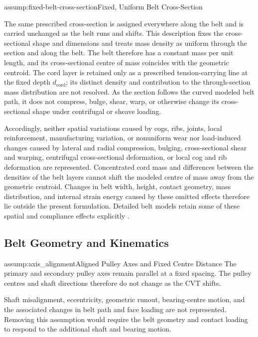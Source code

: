 \documentclass[11pt]{report}
\numberwithin{equation}{section}
\newcounter{assump}
\begin{document}
\begin{assumptionblock}{assump:fixed-belt-cross-section}{Fixed, Uniform Belt Cross-Section}

The same prescribed cross-section is assigned everywhere along the belt and is
carried unchanged as the belt runs and shifts. This description fixes the
cross-sectional shape and dimensions and treats mass density as uniform through
the section and along the belt. The belt therefore has a constant mass per unit
length, and its cross-sectional centre of mass coincides with the geometric
centroid. The cord layer is retained only as a prescribed tension-carrying line
at the fixed depth \(d_{\mathrm{cord}}\); its distinct density and contribution
to the through-section mass distribution are not resolved. As the section
follows the curved modeled belt path, it does not compress, bulge, shear, warp,
or otherwise change its cross-sectional shape under centrifugal or sheave
loading.

\AssumptionConsequences
Accordingly, neither spatial variations caused by cogs, ribs, joints, local
reinforcement, manufacturing variation, or nonuniform wear nor load-induced
changes caused by lateral and radial compression, bulging, cross-sectional
shear and warping, centrifugal cross-sectional deformation, or local cog and
rib deformation are represented. Concentrated cord mass and differences
between the densities of the belt layers cannot shift the modeled centre of
mass away from the geometric centroid. Changes in belt width, height, contact
geometry, mass distribution, and internal strain energy caused by these
omitted effects therefore lie outside the present formulation. Detailed belt
models retain some of these spatial and compliance effects explicitly
\citep{Gerbert1996,KongParker2005,Messick2018}.

\end{assumptionblock}


\subsection{Belt Geometry and Kinematics}

\begin{assumptionblock}{assump:axis_alignment}{Aligned Pulley Axes and Fixed Centre Distance}
The primary and secondary pulley axes remain parallel at a fixed spacing. The
pulley centres and shaft directions therefore do not change as the CVT shifts.

\AssumptionConsequences
Shaft misalignment, eccentricity, geometric runout, bearing-centre motion, and
the associated changes in belt path and face loading are not represented.
Removing this assumption would require the belt geometry and contact loading
to respond to the additional shaft and bearing motion.
\end{assumptionblock}
\end{document}

